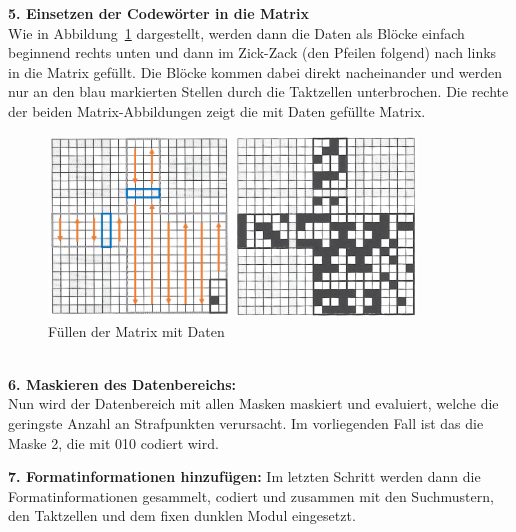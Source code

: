 \textbf{5. Einsetzen der Codewörter in die Matrix}\\
Wie in Abbildung~\ref{fig:filldata} dargestellt, werden dann die Daten als Blöcke einfach beginnend rechts unten und dann im Zick-Zack (den Pfeilen folgend) nach links in die Matrix gefüllt. Die Blöcke kommen dabei direkt nacheinander und werden nur an den blau markierten Stellen durch die Taktzellen unterbrochen. Die rechte der beiden Matrix-Abbildungen zeigt die mit Daten gefüllte Matrix.
\begin{figure}[htbp]
	\parbox{.47\textwidth}
	{
		\centering
		\includegraphics[height=4.8cm]{Bilder/QR_Fill_Data_Start_1.png}
	}
	\hfill
	\parbox{.47\textwidth}
	{
		\centering
		\includegraphics[height=4.8cm]{Bilder/QR_Fill_Data_End.png}
	}
\caption[Füllen der Matrix mit Daten]{Füllen der Matrix mit Daten\footnotemark}
\label{fig:filldata}
	\hfill
\end{figure}
~\\

\textbf{6. Maskieren des Datenbereichs:}\\
Nun wird der Datenbereich mit allen Masken maskiert und evaluiert, welche die geringste Anzahl an Strafpunkten verursacht. Im vorliegenden Fall ist das die Maske 2, die mit 010 codiert wird.

\textbf{7. Formatinformationen hinzufügen:}
Im letzten Schritt werden dann die Formatinformationen gesammelt, codiert und zusammen mit den 
Suchmustern, den Taktzellen und dem fixen dunklen Modul eingesetzt.

